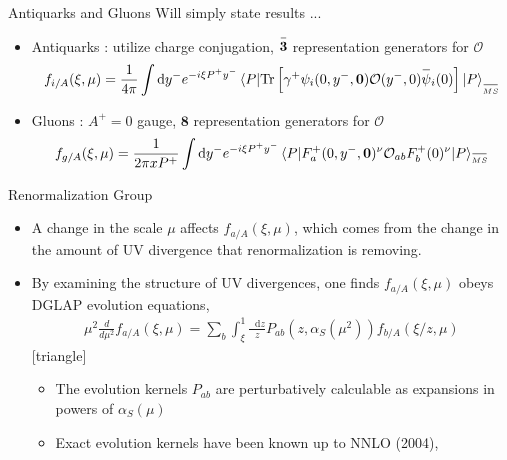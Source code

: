 \documentclass[aspectratio=169,xcolor=dvipsnames]{beamer}
\newcommand{\dder}[2]{\frac{d#1}{d#2}}
\newcommand{\overbar}[1]{
	\mkern 1.5mu \overline{\mkern-1.5mu\raisebox{0pt}[\dimexpr\height+0.5mm\relax]{$#1$}\mkern-1.5mu}\mkern 1.5mu
}
\newcommand*\dif{\mathop{}\!\mathrm{d}}
\begin{document}
\begin{frame}{Antiquarks and Gluons}
	Will simply state results ... \vskip0.15in
	\begin{itemize}
		\item Antiquarks : utilize charge conjugation, $\overbar{\mathbf{3}}$ representation generators for $\mathcal{O}$
		\begin{align*}
			f_{i/A}(\xi,\mu) = \frac{1}{4\pi} \int \dif y^- e^{-i\xi P^+ y^-} \braket{P|\text{Tr}\left[\gamma^+ \psi_i(0,y^-,\mathbf{0})\mathcal{O}(y^-,0)\overbar{\psi}_i(0) \right]  |P}_{\tiny\overbar{MS}}
		\end{align*}
		\item Gluons : $A^+=0$ gauge, $\mathbf{8}$ representation generators for $\mathcal{O}$
		\begin{align*}
			f_{g/A}(\xi,\mu) = \frac{1}{2\pi x P^+} \int \dif y^- e^{-i\xi P^+ y^-} \braket{P|F^+_a(0,y^-,\mathbf{0})^\nu \mathcal{O}_{ab} F^+_b(0)^\nu|P}_{\tiny\overbar{MS}}
		\end{align*}
	\end{itemize}
\end{frame}

\begin{frame}{Renormalization Group}
	\begin{itemize}
		\item A change in the scale $\mu$ affects $f_{a/A}(\xi,\mu)$, which comes from the change in the amount of UV divergence that renormalization is removing.
		\item By examining the structure of UV divergences, one finds $f_{a/A}(\xi,\mu)$ obeys DGLAP evolution equations,
		\begin{align*}
			\mu^2 \dder{}{ \mu^2} f_{a/A}(\xi,\mu) = \sum_b \int_{\xi}^1 \frac{\dif z}{z} P_{ab}(z,\alpha_S(\mu^2))f_{b/A}(\xi/z,\mu)
		\end{align*}
		[triangle]
		\begin{itemize}
			\item The evolution kernels $P_{ab}$ are perturbatively calculable as expansions in powers of $\alpha_S(\mu)$
			\item Exact evolution kernels have been known up to NNLO (2004), 
		\end{itemize}
	\end{itemize}
\end{frame}
\end{document}
